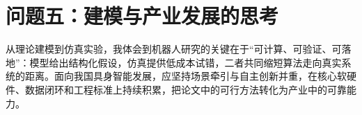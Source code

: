 \section{问题五：建模与产业发展的思考}
从理论建模到仿真实验，我体会到机器人研究的关键在于“可计算、可验证、可落地”：模型给出结构化假设，仿真提供低成本试错，二者共同缩短算法走向真实系统的距离。面向我国具身智能发展，应坚持场景牵引与自主创新并重，在核心软硬件、数据闭环和工程标准上持续积累，把论文中的可行方法转化为产业中的可靠能力。
